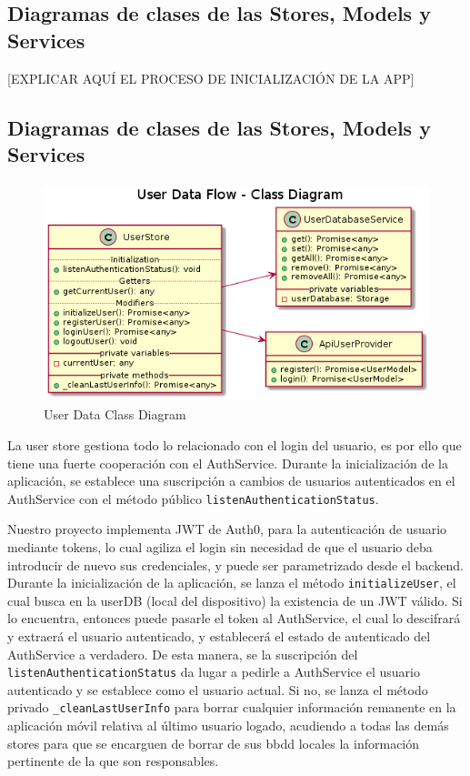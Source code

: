 \subsection{Diagramas de clases de las Stores, Models y Services}
\label{makereference4.6.4}

[EXPLICAR AQUÍ EL PROCESO DE INICIALIZACIÓN DE LA APP]

\subsection{Diagramas de clases de las Stores, Models y Services}
\label{makereference4.6.5}

\begin{figure}[hbt!]
\centering
\includegraphics[height=2.5in]{figures/diagrams/front/data-flow/user.png}
\caption[user]{User Data Class Diagram\footnotemark}
\end{figure}

La user store gestiona todo lo relacionado con el login del usuario, es por ello que tiene una fuerte cooperación con el AuthService. Durante la inicialización de la aplicación, se establece una suscripción a cambios de usuarios autenticados en el AuthService con el método público \verb|listenAuthenticationStatus|.

\vspace{0.5cm}

Nuestro proyecto implementa JWT de Auth0, para la autenticación de usuario mediante tokens, lo cual agiliza el login sin necesidad de que el usuario deba introducir de nuevo sus credenciales, y puede ser parametrizado desde el backend. Durante la inicialización de la aplicación, se lanza el método \verb|initializeUser|, el cual busca en la userDB (local del dispositivo) la existencia de un JWT válido. Si lo encuentra, entonces puede pasarle el token al AuthService, el cual lo descifrará y extraerá el usuario autenticado, y establecerá el estado de autenticado del AuthService a verdadero. De esta manera, se la suscripción del \verb|listenAuthenticationStatus| da lugar a pedirle a AuthService el usuario autenticado y se establece como el usuario actual. Si no, se lanza el método privado \verb|_cleanLastUserInfo| para borrar cualquier información remanente en la aplicación móvil relativa al último usuario logado, acudiendo a todas las demás stores para que se encarguen de borrar de sus \gls{bbdd} locales la información pertinente de la que son responsables.

